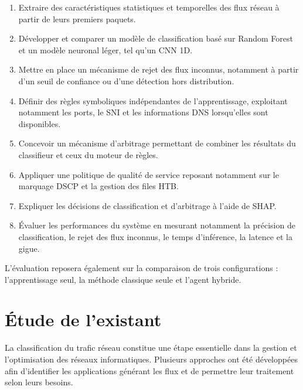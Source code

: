 \begin{enumerate}
    \item Extraire des caractéristiques statistiques et temporelles
    des flux réseau à partir de leurs premiers paquets.
    
    \item Développer et comparer un modèle de classification basé sur
    Random Forest et un modèle neuronal léger, tel qu'un CNN 1D.
    
    \item Mettre en place un mécanisme de rejet des flux inconnus,
    notamment à partir d'un seuil de confiance ou d'une détection
    hors distribution.
    
    \item Définir des règles symboliques indépendantes de
    l'apprentissage, exploitant notamment les ports, le SNI et les
    informations DNS lorsqu'elles sont disponibles.
    
    \item Concevoir un mécanisme d'arbitrage permettant de combiner
    les résultats du classifieur et ceux du moteur de règles.
    
    \item Appliquer une politique de qualité de service reposant
    notamment sur le marquage DSCP et la gestion des files HTB.
    
    \item Expliquer les décisions de classification et d'arbitrage
    à l'aide de SHAP.
    
    \item Évaluer les performances du système en mesurant notamment
    la précision de classification, le rejet des flux inconnus,
    le temps d'inférence, la latence et la gigue.
\end{enumerate}

L'évaluation reposera également sur la comparaison de trois
configurations : l'apprentissage seul, la méthode classique seule
et l'agent hybride.


\section{Étude de l'existant}

La classification du trafic réseau constitue une étape essentielle
dans la gestion et l'optimisation des réseaux informatiques. Plusieurs
approches ont été développées afin d'identifier les applications
générant les flux et de permettre leur traitement selon leurs besoins.

